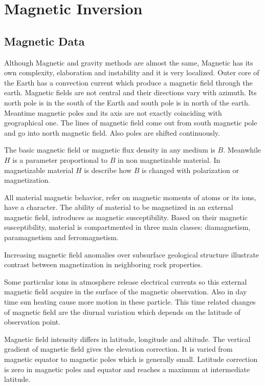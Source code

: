 \chapter{Magnetic Inversion}\label{Chp:cook:magnetic inversion}

\section{Magnetic Data} 
Although Magnetic and gravity methods are almost the same, Magnetic has its own complexity, elaboration and instability and it is very localized. Outer core of the Earth has a convection current which produce a magnetic field through the earth. Magnetic fields are not central and their directions vary with azimuth. Its north pole is in the south of the Earth and south pole is in north of the earth. Meantime magnetic poles and its axis are not exactly coinciding with geographical one. The lines of magnetic field come out from south magnetic pole and go into north magnetic field. Also poles are shifted continuously.

The basic magnetic field or magnetic flux density in any medium is $B$. Meanwhile $H$ is a parameter proportional to $B$ in non magnetizable material. In magnetizable material $H$ is describe how $B$ is changed with polarization or magnetization.

All material magnetic behavior, refer on magnetic moments of atoms or its ions, have a character. The ability of material to be magnetized in an external magnetic field, introduces as magnetic susceptibility. Based on their magnetic susceptibility, material is compartmented in three main classes: diamagnetism, paramagnetism and ferromagnetism.

Increasing magnetic field anomalies over subsurface geological structure illustrate contrast between magnetization in neighboring rock properties.

Some particular ions in atmosphere release electrical currents so this external magnetic field acquire in the surface of the magnetic observation. Also in day time sun heating cause more motion in these particle. This time related changes of magnetic field are the diurnal variation which depends on the latitude of observation point. 

Magnetic field intensity differs in latitude, longitude and altitude. The vertical gradient of magnetic field gives the elevation correction. It is varied from magnetic equator to magnetic poles which is generally small. Latitude correction is zero in magnetic poles and equator and reaches a maximum at intermediate latitude.


